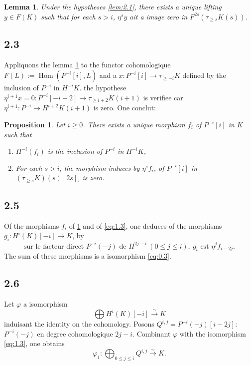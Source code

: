 \documentclass[11pt,a4paper]{article}
\theoremstyle{plain}
\newtheorem{lemma}[theorem]{Lemma}
\newtheorem{proposition}[theorem]{Proposition}
\theoremstyle{definition}
\DeclareMathOperator{\Hom}{Hom}
\begin{document}
\begin{lemma}\label{lem:2.2}
Under the hypotheses \ref{lem:2.1}, there exists a unique lifting $y \in F(K)$ such that for each $s > i$, $\eta^s y$ ait a image zero in $F^{2s}(\tau_{\geqslant s} K(s))$.
\end{lemma}

\subsection*{2.3}
Appliquons the lemma \ref{lem:2.2} to the functor cohomologique $F(L) := \Hom(P^{-i}[i], L)$ and a $x \colon P^{-i}[i] \to \tau_{\geqslant -i} K$ defined by the inclusion of $P^{-i}$ in $H^{-i} K$. the hypothese $\eta^{i+1} x = 0 \colon P^{-i}[-i-2] \to \tau_{\geqslant i+2} K(i+1)$ is verifiee car $\eta^{i+1} \colon P^{-i} \to H^{i+2} K(i+1)$ is zero. One conclut:

\begin{proposition}\label{prop:2.4}
Let $i \geqslant 0$. There exists a unique morphism $f_i$ of $P^{-i}[i]$ in $K$ such that
\begin{enumerate}[label=\textup{(\roman*)}]
\item $H^{-i}(f_i)$ is the inclusion of $P^{-i}$ in $H^{-i} K$,
\item For each $s > i$, the morphism induces by $\eta^s f_i$, of $P^{-i}[i]$ in $(\tau_{\geqslant s} K)(s)[2s]$, is zero.
\end{enumerate}
\end{proposition}

\subsection*{2.5}
Of the morphisms $f_i$ of \ref{prop:2.4} and of \eqref{eq:1.3}, one deduces of the morphisms $g_i \colon H^i(K)[-i] \to K$, by
\begin{equation}\label{eq:2.5.1}
\text{sur le facteur direct } P^{-i}(-j) \text{ de } H^{2j-i}\ (0 \leqslant j \leqslant i),\ g_i \text{ est } \eta^j f_{i-2j}.
\end{equation}
The sum of these morphisms is a isomorphism \eqref{eq:0.3}.

\subsection*{2.6}
Let $\varphi$ a isomorphism
\[
\bigoplus H^i(K)[-i] \xrightarrow{\sim} K
\]
induisant the identity on the cohomology. Posons $Q^{i,j} = P^{-i}(-j)[i-2j]$: $P^{-i}(-j)$ en degree cohomologique $2j-i$. Combinant $\varphi$ with the isomorphism \eqref{eq:1.3}, one obtains
\begin{equation}\label{eq:2.6.1}
\varphi_1 \colon \bigoplus_{0 \leqslant j \leqslant i} Q^{i,j} \xrightarrow{\sim} K.
\end{equation}
\end{document}
